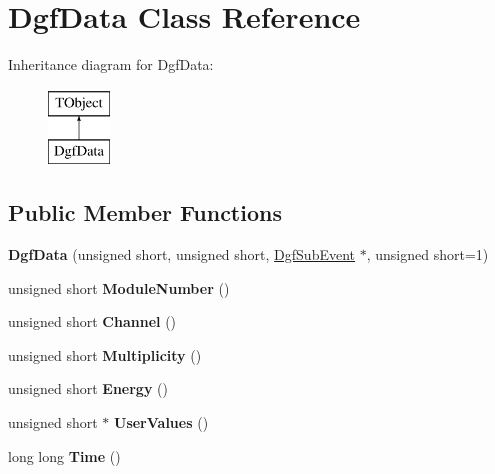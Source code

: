 \hypertarget{class_dgf_data}{\section{Dgf\-Data Class Reference}
\label{class_dgf_data}
}
Inheritance diagram for Dgf\-Data\-:\begin{figure}[H]
\begin{center}
\leavevmode
\includegraphics[height=2.000000cm]{class_dgf_data}
\end{center}
\end{figure}
\subsection*{Public Member Functions}
\begin{DoxyCompactItemize}
\item 
\hypertarget{class_dgf_data_a920d0f59bab2274d5e4ef3e80ea1a79e}{{\bfseries Dgf\-Data} (unsigned short, unsigned short, \hyperlink{class_dgf_sub_event}{Dgf\-Sub\-Event} $\ast$, unsigned short=1)}\label{class_dgf_data_a920d0f59bab2274d5e4ef3e80ea1a79e}

\item 
\hypertarget{class_dgf_data_a55d760ffcd84c99875532506563393eb}{unsigned short {\bfseries Module\-Number} ()}\label{class_dgf_data_a55d760ffcd84c99875532506563393eb}

\item 
\hypertarget{class_dgf_data_a37c740809015bde32af4220d15616b89}{unsigned short {\bfseries Channel} ()}\label{class_dgf_data_a37c740809015bde32af4220d15616b89}

\item 
\hypertarget{class_dgf_data_adbf9d6108fb3a0a79d119d941a3604ac}{unsigned short {\bfseries Multiplicity} ()}\label{class_dgf_data_adbf9d6108fb3a0a79d119d941a3604ac}

\item 
\hypertarget{class_dgf_data_a7cb7c0ac2a7553f9cb5512e781eb8d75}{unsigned short {\bfseries Energy} ()}\label{class_dgf_data_a7cb7c0ac2a7553f9cb5512e781eb8d75}

\item 
\hypertarget{class_dgf_data_a63542c903350303507d6f07f900660f6}{unsigned short $\ast$ {\bfseries User\-Values} ()}\label{class_dgf_data_a63542c903350303507d6f07f900660f6}

\item 
\hypertarget{class_dgf_data_a836a43c2de36765b3a6acd16907b47e2}{long long {\bfseries Time} ()}\label{class_dgf_data_a836a43c2de36765b3a6acd16907b47e2}

\end{DoxyCompactItemize}
